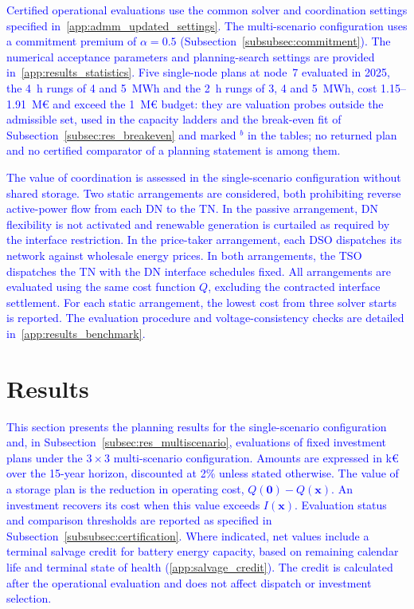 \documentclass[preprint,12pt]{elsarticle}
\begin{document}
\textcolor{blue}{
    Certified operational evaluations use the common solver and coordination settings specified in~\ref{app:admm_updated_settings}.
    The multi-scenario configuration uses a commitment premium of $\alpha = 0.5$ (Subsection~\ref{subsubsec:commitment}).
    The numerical acceptance parameters and planning-search settings are provided in~\ref{app:results_statistics}.
    Five single-node plans at node~7 evaluated in 2025, the 4~h rungs of 4 and 5~MWh and the 2~h rungs of 3, 4 and 5~MWh, cost 1.15--1.91~M\euro{} and exceed the 1~M\euro{} budget: they are valuation probes outside the admissible set, used in the capacity ladders and the break-even fit of Subsection~\ref{subsec:res_breakeven} and marked $^{b}$ in the tables; no returned plan and no certified comparator of a planning statement is among them.
}

\textcolor{blue}{
    The value of coordination is assessed in the single-scenario configuration without shared storage. Two static arrangements are considered, both prohibiting reverse active-power flow from each DN to the TN. In the passive arrangement, DN flexibility is not activated and renewable generation is curtailed as required by the interface restriction. In the price-taker arrangement, each DSO dispatches its network against wholesale energy prices. In both arrangements, the TSO dispatches the TN with the DN interface schedules fixed.
    All arrangements are evaluated using the same cost function $Q$, excluding the contracted interface settlement. For each static arrangement, the lowest cost from three solver starts is reported. The evaluation procedure and voltage-consistency checks are detailed in~\ref{app:results_benchmark}.
}


\section{Results}
\label{sec:results}

\textcolor{blue}{
    This section presents the planning results for the single-scenario configuration and, in Subsection~\ref{subsec:res_multiscenario}, evaluations of fixed investment plans under the $3 \times 3$ multi-scenario configuration. Amounts are expressed in k\euro{} over the 15-year horizon, discounted at 2\% unless stated otherwise.
    The value of a storage plan is the reduction in operating cost, $Q(\boldsymbol{0}) - Q(\boldsymbol{x})$. An investment recovers its cost when this value exceeds $I(\boldsymbol{x})$. Evaluation status and comparison thresholds are reported as specified in Subsection~\ref{subsubsec:certification}.
    Where indicated, net values include a terminal salvage credit for battery energy capacity, based on remaining calendar life and terminal state of health (\ref{app:salvage_credit}). The credit is calculated after the operational evaluation and does not affect dispatch or investment selection.
}
\end{document}
